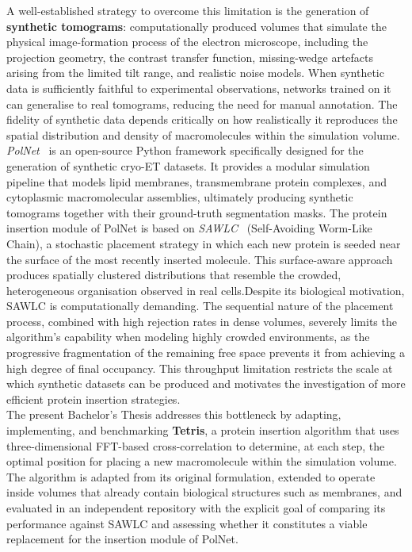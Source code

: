 A well-established strategy to overcome this limitation is the generation of \textbf{synthetic
tomograms}: computationally produced volumes that simulate the physical image-formation process
of the electron microscope, including the projection geometry, the contrast transfer function,
missing-wedge artefacts arising from the limited tilt range, and realistic noise models.
When synthetic data is sufficiently faithful to experimental observations, networks trained on it
can generalise to real tomograms, reducing the need for manual annotation. The fidelity of
synthetic data depends critically on how realistically it reproduces the spatial distribution
and density of macromolecules within the simulation volume.\\

\textit{PolNet}~\cite{martinezSanchezPolnetGithub} is an open-source Python framework specifically designed for the generation of
synthetic cryo-ET datasets. It provides a modular simulation pipeline that models lipid membranes,
transmembrane protein complexes, and cytoplasmic macromolecular assemblies, ultimately producing
synthetic tomograms together with their ground-truth segmentation masks. The protein insertion
module of PolNet is based on \textit{SAWLC}~\cite{martinezSanchez2024simulating} (Self-Avoiding Worm-Like Chain), a stochastic
placement strategy in which each new protein is seeded near the surface of the most recently
inserted molecule. This surface-aware approach produces spatially clustered distributions that
resemble the crowded, heterogeneous organisation observed in real cells.Despite its biological motivation, SAWLC is computationally demanding. The sequential nature of the placement process, combined with high rejection rates in dense volumes, severely limits the algorithm's capability when modeling highly crowded environments, as the progressive fragmentation of the remaining free space prevents it from achieving a high degree of final occupancy. This throughput limitation
restricts the scale at which synthetic datasets can be produced and motivates the investigation of
more efficient protein insertion strategies.\\

The present Bachelor's Thesis addresses this bottleneck by adapting, implementing, and
benchmarking \textbf{Tetris}, a protein insertion algorithm that uses three-dimensional
FFT-based cross-correlation to determine, at each step, the optimal position for placing a
new macromolecule within the simulation volume. The algorithm is adapted from its original
formulation, extended to operate inside volumes that already contain biological structures
such as membranes, and evaluated in an independent repository with the explicit goal of
comparing its performance against SAWLC and assessing whether it constitutes a viable
replacement for the insertion module of PolNet.\\

